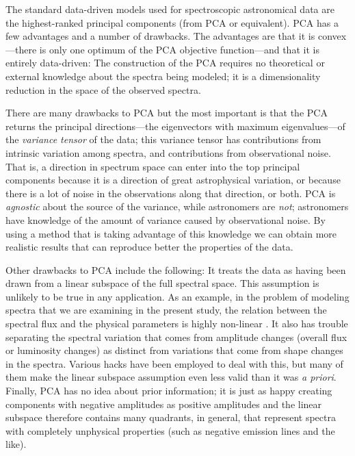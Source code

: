 \documentclass[12pt,preprint]{aastex}
\begin{document}
The standard data-driven models used for spectroscopic astronomical
data are the highest-ranked principal components (from PCA or
equivalent). PCA has a few advantages and a number of drawbacks.  The
advantages are that it is convex---there is only one optimum of the PCA
objective function---and that it is
entirely data-driven: The construction of the
PCA requires no theoretical or external knowledge about the spectra
being modeled; it is a dimensionality reduction in the space of the
observed spectra.

There are many drawbacks to PCA but the most important is that the PCA
returns the principal directions---the eigenvectors with maximum
eigenvalues---of the \emph{variance tensor} of the data; this variance
tensor has contributions from intrinsic variation among spectra, and
contributions from observational noise.  That is, a direction in
spectrum space can enter into the top principal components because it
is a direction of great astrophysical variation, or because there is a
lot of noise in the observations along that direction, or both.  PCA
is \emph{agnostic} about the source of the variance, while astronomers are
\emph{not}; astronomers have knowledge of the amount of variance caused by 
observational noise. By using a method that is taking advantage of this 
knowledge we can obtain more realistic results that can reproduce better the properties 
of the data.

Other drawbacks to PCA include the following: It treats the data as
having been drawn from a linear subspace of the full spectral
space. This assumption is unlikely to be true in any application. 
As an example, in the problem of modeling spectra that we are 
examining in the present study, the relation between the spectral flux 
and the physical parameters is highly non-linear \citep{vanderplas}.  It
also has trouble separating the spectral variation that comes from
amplitude changes (overall flux or luminosity changes) as distinct
from variations that come from shape changes in the spectra.  Various
hacks have been employed to deal with this, but many of them make the
linear subspace assumption even less valid than it was \textit{a
  priori}. Finally, PCA has no idea about prior information; it is
just as happy creating components with negative amplitudes as positive
amplitudes and the linear subspace therefore contains many quadrants,
in general, that represent spectra with completely unphysical
properties (such as negative emission lines and the like).
\end{document}
